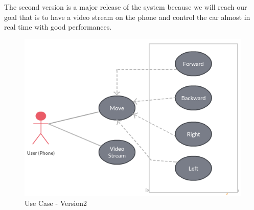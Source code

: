 \documentclass[11pt]{article}
\begin{document}
\vspace{0.20cm}
\begin{flushleft}
The second version is a major release of the system because we will reach our goal that is to have a video stream on the phone and control the car almost in real time with good performances.
\end{flushleft}
\begin{figure}[h]
\centering
\includegraphics[scale=0.49]{RobotUML_V2.png}
\caption{Use Case - Version2}
\end{figure}

\pagebreak


\end{document}
